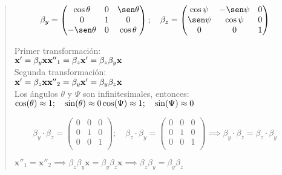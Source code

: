\documentclass[a4paper,12pt,twoside,final,spanish]{article}
\begin{document}
\dotfill
\begin{quote}
\[
\beta_{y}=\left(\begin{matrix}
\cos\theta & 0 & \sen\theta\\
0 & 1 & 0\\
-\sen\theta & 0 & \cos\theta\\
\end{matrix}\right);\quad
\beta_{z}=\left(\begin{matrix}
\cos\psi & -\sen\psi & 0\\
\sen\psi & \cos\psi & 0\\
0 & 0 & 1\\
\end{matrix}\right)
\]

Primer transformación:\\
$\mathbf{x'}=\beta_{y}\mathbf{x}\\
\mathbf{x''}_{1}=\beta_{z}\mathbf{x'}=\beta_{z}\beta_{y}\mathbf{x}$\\

Segunda transformación:\\
$\mathbf{x'}=\beta_{z}\mathbf{x}\\
\mathbf{x''}_{2}=\beta_{y}\mathbf{x'}=\beta_{y}\beta_{z}\mathbf{x}$\\

Los ángulos $\theta$ y $\Psi$ son infinitesimales, entonces:\\ 

$\cos(\theta)\approx 1;\quad\sin(\theta)\approx 0\\
\cos(\Psi)\approx 1;\quad\sin(\Psi)\approx 0$

\[
\beta_{y}\cdot\beta_{z}=\left(\begin{matrix}
0 & 0 & 0\\
0 & 1 & 0\\
0 & 0 & 1\\
\end{matrix}\right);\quad
\beta_{z}\cdot\beta_{y}=\left(\begin{matrix}
0 & 0 & 0\\
0 & 1 & 0\\
0 & 0 & 1\\
\end{matrix}\right)\implies\beta_{y}\cdot\beta_{z}=\beta_{z}\cdot\beta_{y}
\]

$\mathbf{x''}_{1}=\mathbf{x''}_2\implies\beta_{z}\beta_{y}\mathbf{x}=\beta_{y}\beta_{z}\mathbf{x}\implies\beta_{z}\beta_{y}=\beta_{y}\beta_{z}$
\end{quote}
\end{document}
